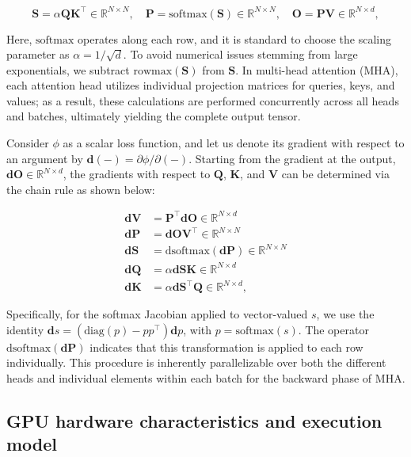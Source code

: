 \begin{equation*}
  \mathbf{S} = \alpha \mathbf{Q} \mathbf{K}^\top \in \mathbb{R}^{N \times N}, \quad \mathbf{P} = \mathrm{softmax}(\mathbf{S}) \in \mathbb{R}^{N \times N}, \quad \mathbf{O} = \mathbf{P}\mathbf{V} \in \mathbb{R}^{N \times d},
\end{equation*}

Here, $\mathrm{softmax}$ operates along each row, and it is standard to choose the scaling parameter as $\alpha = 1/\sqrt{d}$. To avoid numerical issues stemming from large exponentials, we subtract $\mathrm{rowmax}(\mathbf{S})$ from $\mathbf{S}$. In multi-head attention (MHA), each attention head utilizes individual projection matrices for queries, keys, and values; as a result, these calculations are performed concurrently across all heads and batches, ultimately yielding the complete output tensor.

Consider $\phi$ as a scalar loss function, and let us denote its gradient with respect to an argument by $\mathbf{d}(-) = \partial \phi / \partial (-)$. Starting from the gradient at the output, $\mathbf{dO} \in \mathbb{R}^{N \times d}$, the gradients with respect to $\mathbf{Q}$, $\mathbf{K}$, and $\mathbf{V}$ can be determined via the chain rule as shown below:

\begin{align*}
  \mathbf{dV} &= \mathbf{P}^\top \mathbf{dO} \in \mathbb{R}^{N \times d} \\
  \mathbf{dP} &= \mathbf{dO} \mathbf{V}^\top \in \mathbb{R}^{N \times N} \\
  \mathbf{dS} &= \mathrm{dsoftmax} (\mathbf{dP}) \in \mathbb{R}^{N \times N} \\
  \mathbf{dQ} &= \alpha \mathbf{dS} \mathbf{K} \in \mathbb{R}^{N \times d} \\
  \mathbf{dK} &= \alpha \mathbf{dS}^\top \mathbf{Q} \in \mathbb{R}^{N \times d},
\end{align*}

Specifically, for the softmax Jacobian applied to vector-valued $s$, we use the identity $\mathbf{d}s = (\mathrm{diag}(p) - p p^\top)\mathbf{d}p$, with $p = \mathrm{softmax}(s)$. The operator $\mathrm{dsoftmax}(\mathbf{dP})$ indicates that this transformation is applied to each row individually. This procedure is inherently parallelizable over both the different heads and individual elements within each batch for the backward phase of MHA.

\subsection{GPU hardware characteristics and execution model}
\label{subsec:hardware}

